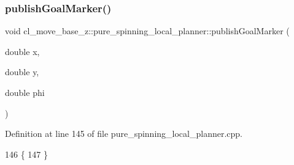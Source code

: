 \subsubsection{\texorpdfstring{publish\+Goal\+Marker()}{publishGoalMarker()}}
{\footnotesize\ttfamily void cl\+\_\+move\+\_\+base\+\_\+z\+::pure\+\_\+spinning\+\_\+local\+\_\+planner\+::publish\+Goal\+Marker (\begin{DoxyParamCaption}\item[{double}]{x,  }\item[{double}]{y,  }\item[{double}]{phi }\end{DoxyParamCaption})}



Definition at line 145 of file pure\+\_\+spinning\+\_\+local\+\_\+planner.\+cpp.


\begin{DoxyCode}
146 \{
147 \}
\end{DoxyCode}
